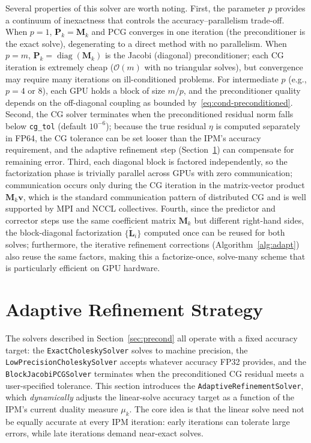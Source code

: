 \documentclass[11pt,twoside]{article}
\newcommand{\bL}{\mathbf{L}}
\newcommand{\bM}{\mathbf{M}}
\newcommand{\bP}{\mathbf{P}}
\newcommand{\bv}{\mathbf{v}}
\newcommand{\cO}{\mathcal{O}}
\newcommand{\diag}{\operatorname{diag}}
\begin{document}
Several properties of this solver are worth noting.  First, the parameter
$p$ provides a continuum of inexactness that controls the
accuracy--parallelism trade-off.  When $p = 1$, $\bP_k = \bM_k$ and PCG
converges in one iteration (the preconditioner is the exact solve),
degenerating to a direct method with no parallelism.  When $p = m$,
$\bP_k = \diag(\bM_k)$ is the Jacobi (diagonal) preconditioner; each CG
iteration is extremely cheap ($\cO(m)$ with no triangular solves), but
convergence may require many iterations on ill-conditioned problems.  For
intermediate $p$ (e.g., $p = 4$ or $8$), each GPU holds a block of size
$m/p$, and the preconditioner quality depends on the off-diagonal coupling
as bounded by~\eqref{eq:cond-preconditioned}.  Second, the CG solver
terminates when the preconditioned residual norm falls below
\texttt{cg\_tol} (default $10^{-6}$); because the true residual $\eta$ is
computed separately in FP64, the CG tolerance can be set looser than the
IPM's accuracy requirement, and the adaptive refinement step
(Section~\ref{sec:adapt}) can compensate for remaining error.  Third, each
diagonal block is factored independently, so the factorization phase is
trivially parallel across GPUs with zero communication; communication
occurs only during the CG iteration in the matrix-vector product $\bM_k
\bv$, which is the standard communication pattern of distributed CG and is
well supported by MPI and NCCL collectives.  Fourth, since the predictor
and corrector steps use the same coefficient matrix $\bM_k$ but different
right-hand sides, the block-diagonal factorization $\{\widetilde{\bL}_i\}$
computed once can be reused for both solves; furthermore, the iterative
refinement corrections (Algorithm~\ref{alg:adapt}) also reuse the same
factors, making this a factorize-once, solve-many scheme that is
particularly efficient on GPU hardware.

\section{Adaptive Refinement Strategy}
\label{sec:adapt}

The solvers described in Section~\ref{sec:precond} all operate with a fixed
accuracy target: the \texttt{ExactCholeskySolver} solves to machine
precision, the \texttt{LowPrecisionCholeskySolver} accepts whatever
accuracy FP32 provides, and the \texttt{BlockJacobiPCGSolver} terminates
when the preconditioned CG residual meets a user-specified tolerance.  This
section introduces the \texttt{AdaptiveRefinementSolver}, which
\emph{dynamically} adjusts the linear-solve accuracy target as a function
of the IPM's current duality measure $\mu_k$.  The core idea is that the
linear solve need not be equally accurate at every IPM iteration: early
iterations can tolerate large errors, while late iterations demand
near-exact solves.
\end{document}
